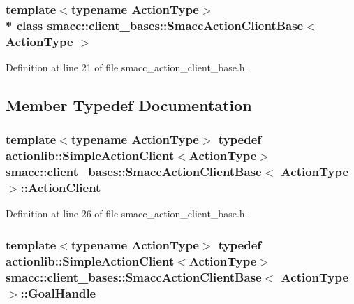 \subsubsection*{template$<$typename Action\+Type$>$\\*
class smacc\+::client\+\_\+bases\+::\+Smacc\+Action\+Client\+Base$<$ Action\+Type $>$}



Definition at line 21 of file smacc\+\_\+action\+\_\+client\+\_\+base.\+h.



\subsection{Member Typedef Documentation}
\subsubsection[{\texorpdfstring{Action\+Client}{ActionClient}}]{\setlength{\rightskip}{0pt plus 5cm}template$<$typename Action\+Type$>$ typedef actionlib\+::\+Simple\+Action\+Client$<$Action\+Type$>$ {\bf smacc\+::client\+\_\+bases\+::\+Smacc\+Action\+Client\+Base}$<$ Action\+Type $>$\+::{\bf Action\+Client}}\hypertarget{classsmacc_1_1client__bases_1_1SmaccActionClientBase_ab4cb0717885b95d577f82f4133db7f5f}{}\label{classsmacc_1_1client__bases_1_1SmaccActionClientBase_ab4cb0717885b95d577f82f4133db7f5f}


Definition at line 26 of file smacc\+\_\+action\+\_\+client\+\_\+base.\+h.

\subsubsection[{\texorpdfstring{Goal\+Handle}{GoalHandle}}]{\setlength{\rightskip}{0pt plus 5cm}template$<$typename Action\+Type$>$ typedef actionlib\+::\+Simple\+Action\+Client$<$Action\+Type$>$ {\bf smacc\+::client\+\_\+bases\+::\+Smacc\+Action\+Client\+Base}$<$ Action\+Type $>$\+::{\bf Goal\+Handle}}\hypertarget{classsmacc_1_1client__bases_1_1SmaccActionClientBase_a43e1a844615218b95151d456eb32b835}{}\label{classsmacc_1_1client__bases_1_1SmaccActionClientBase_a43e1a844615218b95151d456eb32b835}


